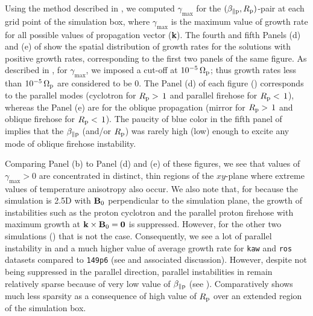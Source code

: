             Using the method described in , we computed
            $\gamma_\mathrm{\max}$ for the $(\beta_{\parallel \rm p},R_{\rm p})$-pair at each grid
            point of the simulation box, where $\gamma_\mathrm{\max}$ is the maximum value of growth
            rate for all possible values of propagation vector (\textbf{k}). The fourth and fifth
            Panels (d) and (e) of  show the spatial distribution of
            growth rates for the solutions with positive growth rates, corresponding to the first
            two panels of the same figure. As described in , for
            $\gamma_\mathrm{max}$, we imposed a cut-off at $10^{-5}\,\Omega_{\rm p}$; thus growth
            rates less than $10^{-5}\,\Omega_{\rm p}$ are considered to be 0. The Panel (d) of each
            figure () corresponds to the parallel modes (cyclotron
            for $R_{\rm p} > \,1$ and parallel firehose for $R_{\rm p} < \,1$), whereas the Panel
            (e) are for the oblique propagation (mirror for $R_{\rm p} > \,1$ and oblique firehose
            for $R_{\rm p} < \,1$). The paucity of blue color in the fifth panel of
             implies that the $\beta_{\parallel \rm p}$ (and/or $R_{\rm
            p}$) was rarely high (low) enough to excite any mode of oblique firehose instability.

            Comparing Panel (b) to Panel (d) and (e) of these figures, we see that values of
            $\gamma_\mathrm{max}>0$ are concentrated in distinct, thin regions of the $xy$-plane
            where extreme values of temperature anisotropy also occur. We also note that, for
             because the simulation is 2.5D with $\mathbf{B_{\rm 0}}$ perpendicular
            to the simulation plane, the growth of instabilities such as the proton cyclotron and
            the parallel proton firehose with maximum growth at $\mathbf{k \times B_{\rm 0} = 0}$ is
            suppressed. However, for the other two simulations () that
            is not the case. Consequently, we see a lot of parallel instability in 
            and a much higher value of average growth rate for \texttt{kaw} and \texttt{ros}
            datasets compared to \texttt{149p6} (see  and associated
            discussion). However, despite not being suppressed in the parallel direction, parallel
            instabilities in  remain relatively sparse because of very low value of
            $\beta_{\parallel \rm p}$ (see ). Comparatively 
            shows much less sparsity as a consequence of high value of $R_{\rm p}$ over an extended
            region of the simulation box.

